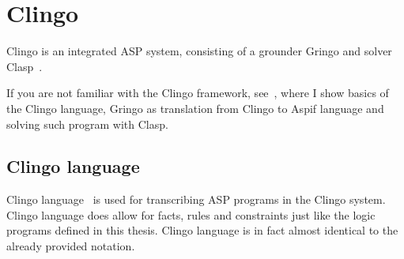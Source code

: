\section{Clingo}\label{sec:clingo}

Clingo is an integrated ASP system, consisting of a grounder Gringo and solver
Clasp~\cite{aspEasy2016}.

If you are not familiar with the Clingo framework, see~,
where I show basics of the
Clingo language, Gringo as translation from Clingo to Aspif language and
solving such program with Clasp.

\subsection{Clingo language}\label{sec:clingo_language}
Clingo language~\cite{gebser2019potassco} is used for transcribing ASP programs
in the Clingo system.
Clingo language does allow for facts, rules and constraints just like
the logic programs defined in this thesis. Clingo language is in fact
almost identical to the already provided notation.


